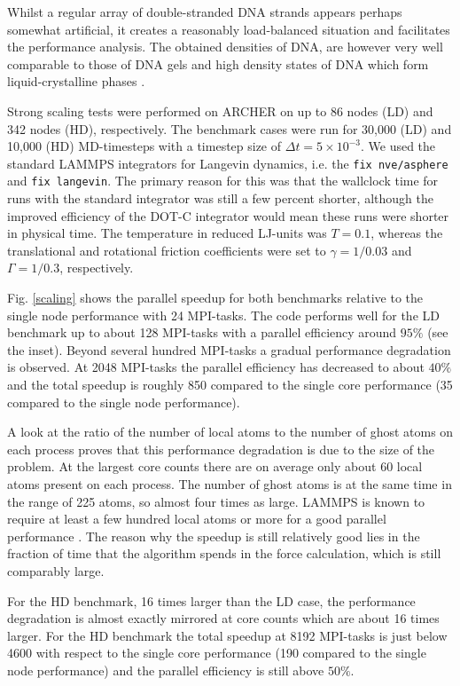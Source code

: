 \documentclass[12pt,onecolumn]{article}
\begin{document}
Whilst a regular array of double-stranded DNA strands appears perhaps somewhat artificial, it creates a reasonably load-balanced 
situation and facilitates the performance analysis. The obtained densities of DNA, are however very well comparable to 
those of DNA gels \cite{Rovigatti:2014} and high density states of DNA which form liquid-crystalline phases \cite{DeMichele:2012}.

Strong scaling tests were performed on ARCHER on up to 86 nodes (LD) and 342 nodes (HD), respectively.
The benchmark cases were run for 30,000 (LD) and 10,000 (HD) MD-timesteps with a timestep size of $\Delta t=5\times10^{-3}$.
We used the standard LAMMPS integrators for Langevin dynamics, i.e. the \texttt{fix nve/asphere} and \texttt{fix langevin}.
The primary reason for this was that the wallclock time for runs with the standard integrator was still a few
percent shorter, although the improved efficiency of the DOT-C integrator would mean these runs were shorter in physical time. 
The temperature in reduced LJ-units was $T=0.1$, whereas the translational and rotational friction coefficients were set to 
$\gamma=1/0.03$ and $\Gamma=1/0.3$, respectively.

Fig. \ref{scaling} shows the parallel speedup for both benchmarks relative to the single node performance with 24 MPI-tasks. The code performs well
for the LD benchmark up to about 128 MPI-tasks with a parallel efficiency around $95\%$ (see the inset). Beyond several hundred MPI-tasks a gradual performance 
degradation is observed. At 2048 MPI-tasks the parallel efficiency has decreased to about $40\%$ and the total speedup is roughly 
850 compared to the single core performance (35 compared to the single node performance). 


A look at the ratio of the number of local atoms to the number of ghost atoms on each process 
proves that this performance degradation is due to the size of the problem. At the largest core counts 
there are on average only about 60 local atoms present on each process. The number of ghost atoms is at the same time in the range of 225 atoms, 
so almost four times as large. LAMMPS is known to require at least a few hundred local atoms or more for a good parallel performance \cite{LAMMPSdoc}. 
The reason why the speedup is still relatively good lies in the fraction of time that the algorithm spends in the force calculation,
which is still comparably large.

For the HD benchmark, 16 times larger than the LD case, the performance degradation is almost exactly mirrored at core counts which are 
about 16 times larger. For the HD benchmark the total speedup at 8192 MPI-tasks is just below 4600 with respect to the single core performance 
(190 compared to the single node performance) and the parallel efficiency is still above $50\%$.
\end{document}
